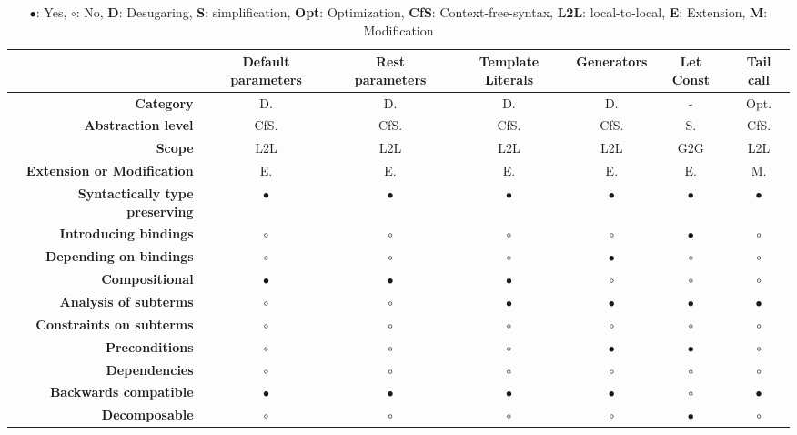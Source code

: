 \begin{landscape}
\begin{table}[h]
\begin{tabular}{rcccccc}
\hline
& {\bf Default parameters} & {\bf Rest parameters} & {\bf Template Literals} & {\bf Generators} & {\bf Let Const} & {\bf Tail call} \\ \hline
{\bf Category} & D. & D. & D. & D. & - & Opt. \\
{\bf Abstraction level} & CfS. & CfS. & CfS. & CfS. & S. & CfS. \\
{\bf Scope} & L2L & L2L & L2L & L2L & G2G & L2L \\
{\bf Extension or Modification} & E. & E. & E. & E. & E. & M. \\
{\bf Syntactically type preserving} & $\bullet$ & $\bullet$ & $\bullet$ & $\bullet$ & $\bullet$  & $\bullet$      \\
{\bf Introducing bindings} & $\circ$ & $\circ$ & $\circ$ & $\circ$ & $\bullet$ & $\circ$ \\
{\bf Depending on bindings} & $\circ$ & $\circ$ & $\circ$ & $\bullet$ & $\circ$ & $\circ$ \\
{\bf Compositional} & $\bullet$ & $\bullet$ & $\bullet$ & $\circ$ & $\circ$ & $\circ$ \\
{\bf Analysis of subterms} & $\circ$ & $\circ$ & $\bullet$ & $\bullet$ & $\bullet$ & $\bullet$ \\
{\bf Constraints on subterms} & $\circ$ & $\circ$ & $\circ$ & $\circ$ & $\circ$ & $\circ$ \\
{\bf Preconditions} & $\circ$ & $\circ$ & $\circ$ & $\bullet$ & $\bullet$ & $\circ$ \\
{\bf Dependencies} & $\circ$ & $\circ$ & $\circ$ & $\circ$ & $\circ$ & $\circ$ \\
{\bf Backwards compatible} & $\bullet$ & $\bullet$ & $\bullet$ & $\bullet$ & $\circ$ & $\bullet$ \\
{\bf Decomposable} & $\circ$ & $\circ$ & $\circ$ & $\circ$ & $\bullet$ & $\circ$ \\ \hline
\end{tabular}
\caption*{$\bullet$: Yes, $\circ$: No, \textbf{D}: Desugaring, \textbf{S}: simplification, \textbf{Opt}: Optimization, \textbf{CfS}: Context-free-syntax, \textbf{L2L}: local-to-local, \textbf{E}: Extension, \textbf{M}: Modification}
\end{table}
\end{landscape}